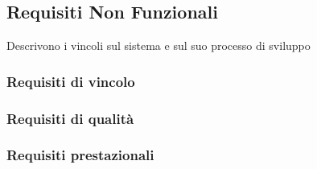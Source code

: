         
        \subsection{Requisiti Non Funzionali}
        Descrivono i vincoli sul sistema e sul suo processo di sviluppo
        \subsubsection{Requisiti di vincolo}
        
        \subsubsection{Requisiti di qualità}
        \subsubsection{Requisiti prestazionali}
